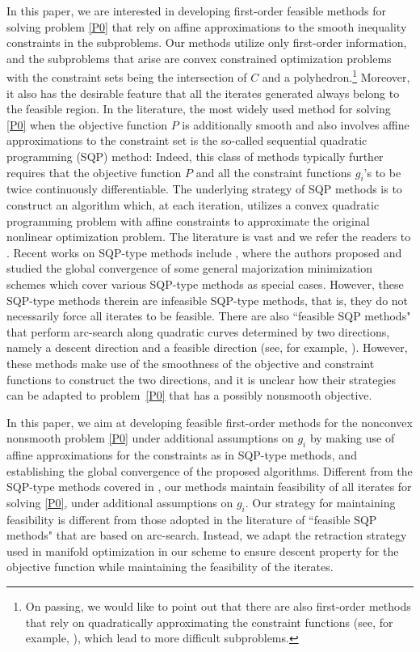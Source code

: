 \documentclass[10pt]{article}
\numberwithin{equation}{section}
\begin{document}
In this paper, we are interested in developing first-order feasible methods for solving problem \eqref{P0} that rely on affine approximations to the smooth inequality constraints in the subproblems. Our methods utilize only first-order information, and the subproblems that arise are convex constrained optimization problems with the constraint sets being the intersection of $C$ and a polyhedron.\footnote{On passing, we would like to point out that there are also first-order methods that rely on quadratically approximating the constraint functions (see, for example, \cite{Au13,AuSheTeb10,BoPau16,YuLP20}), which lead to more difficult subproblems.} Moreover, it also has the desirable feature that  all the iterates generated always belong to the feasible region. In the literature, the most widely used method for solving \eqref{P0} when the objective function $P$ is additionally smooth and also involves affine approximations to the constraint set is the so-called sequential quadratic programming (SQP) method: Indeed, this class of methods typically further requires that the objective function $P$ and all the constraint functions $g_i$'s to be twice continuously differentiable. The underlying strategy of SQP methods is to construct an algorithm which, at each iteration, utilizes a convex quadratic programming problem with affine constraints to approximate the original nonlinear optimization problem. The literature is vast and we refer the readers to \cite{Ber95,NoWr06,GiWo12,FlGL02,So09,Au13,BoPau16,WrightTenny04,PaTi93,FlPa08,LawTits01}.
Recent works on SQP-type methods include \cite{Au13,BoPau16}, where the authors proposed and studied the global convergence of some general majorization minimization schemes which cover various SQP-type methods as special cases. However, these SQP-type methods therein are infeasible SQP-type methods, that is, they do not necessarily force all iterates to be feasible. There are also ``feasible SQP methods" that perform arc-search along quadratic curves determined by two directions, namely a descent direction and a feasible direction (see, for example, \cite{PaTi93,FlPa08,LawTits01}). However, these methods make use of the smoothness of the objective and constraint functions to construct the two directions, and it is unclear how their strategies can be adapted to problem~\eqref{P0} that has a possibly nonsmooth objective.

In this paper, we aim at developing feasible first-order methods for the nonconvex nonsmooth problem \eqref{P0} under additional assumptions on $g_i$ by making use of affine approximations for the constraints as in SQP-type methods, and establishing the global convergence of the proposed algorithms. Different from the SQP-type methods covered in \cite{Au13,BoPau16}, our methods maintain feasibility of all iterates for solving \eqref{P0}, under additional assumptions on $g_i$. Our strategy for maintaining feasibility is different from those adopted in the literature of ``feasible SQP methods" that are based on arc-search. Instead, we adapt the retraction strategy used in manifold optimization \cite{ChenMA20,ChenZM19} in our scheme to ensure descent property for the objective function while maintaining the feasibility of the iterates.
\end{document}
